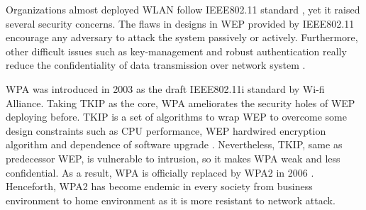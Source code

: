 Organizations almost deployed \ac{WLAN} follow \ac{IEEE}802.11 standard \cite{ieee1999802}, yet it raised several security concerns. The flaws in designs in \ac{WEP} provided by \ac{IEEE}802.11 encourage any adversary to attack the system passively or actively. Furthermore, other difficult issues such as key-management and robust authentication really reduce the confidentiality of data transmission over network system \cite{arbaugh2002your}.

\ac{WPA} was introduced in 2003 \cite{fitzpatrick_2016} as the draft \ac{IEEE}802.11i standard by Wi-fi Alliance. Taking \ac{TKIP} as the core, \ac{WPA} ameliorates the security holes of \ac{WEP} deploying before. \ac{TKIP} is a set of algorithms to wrap \ac{WEP} to overcome some design constraints such as \ac{CPU} performance, \ac{WEP} hardwired encryption algorithm and dependence of software upgrade \cite{doomun2012modified}. Nevertheless, \ac{TKIP}, same as predecessor \ac{WEP}, is vulnerable to intrusion, so it makes \ac{WPA} weak and less confidential. As a result, \ac{WPA} is officially replaced by \ac{WPA}2 in 2006 \cite{fitzpatrick_2016}. Henceforth, \ac{WPA}2 has become endemic in every society from business environment to home environment as it is more resistant to network attack.


